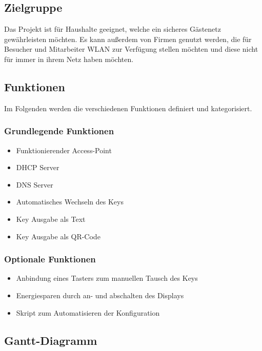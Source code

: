 \documentclass[a4paper,11pt,singlespacing]{article}
\begin{document}
		\subsection{Zielgruppe}
		Das Projekt ist für Haushalte geeignet, welche ein sicheres Gästenetz gewährleisten möchten. Es kann außerdem von Firmen genutzt werden, die für Besucher und Mitarbeiter WLAN zur Verfügung stellen möchten und diese nicht für immer in ihrem Netz haben möchten. 
		
		\subsection{Funktionen}
		Im Folgenden werden die verschiedenen Funktionen definiert und kategorisiert.
			\subsubsection{Grundlegende Funktionen}
			\begin{itemize}
				\item Funktionierender Access-Point
				\item DHCP Server
				\item DNS Server
				\item Automatisches Wechseln des Keys
				\item Key Ausgabe als Text
				\item Key Ausgabe als QR-Code
			\end{itemize}
		
			\subsubsection{Optionale Funktionen}
			\begin{itemize}
				\item Anbindung eines Tasters zum manuellen Tausch des Keys 
				\item Energiesparen durch an- und abschalten des Displays
				\item Skript zum Automatisieren der Konfiguration
			\end{itemize}
			
		\subsection{Gantt-Diagramm}
		
\end{document}
